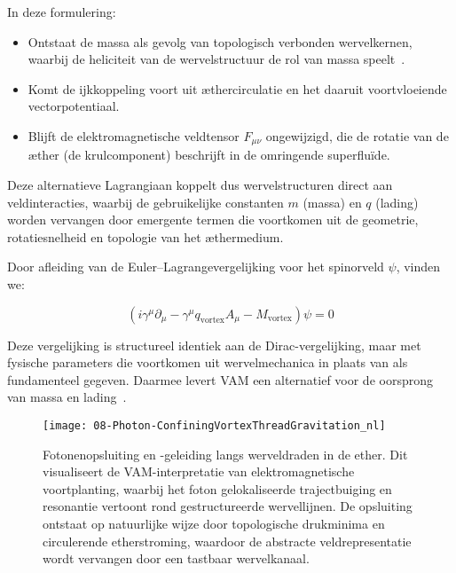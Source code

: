 In deze formulering:

\begin{itemize}
    \item Ontstaat de massa als gevolg van topologisch verbonden wervelkernen, waarbij de heliciteit van de wervelstructuur de rol van massa speelt~\cite{Volovik2003}.
    \item Komt de ijkkoppeling voort uit æthercirculatie en het daaruit voortvloeiende vectorpotentiaal.
    \item Blijft de elektromagnetische veldtensor \( F_{\mu\nu} \) ongewijzigd, die de rotatie van de æther (de krulcomponent) beschrijft in de omringende superfluïde.
\end{itemize}

Deze alternatieve Lagrangiaan koppelt dus wervelstructuren direct aan veldinteracties, waarbij de gebruikelijke constanten \( m \) (massa) en \( q \) (lading) worden vervangen door emergente termen die voortkomen uit de geometrie, rotatiesnelheid en topologie van het æthermedium.

Door afleiding van de Euler–Lagrangevergelijking voor het spinorveld \( \psi \), vinden we:

\begin{equation}
    \boxed{ \left( i \gamma^\mu \partial_\mu - \gamma^\mu q_\text{vortex} A_\mu - M_\text{vortex} \right)\psi = 0 }
\end{equation}

Deze vergelijking is structureel identiek aan de Dirac-vergelijking, maar met fysische parameters die voortkomen uit wervelmechanica in plaats van als fundamenteel gegeven. Daarmee levert VAM een alternatief voor de oorsprong van massa en lading~\cite{Barcelo2011,Volovik2003}.

\begin{figure}[H]
    \centering
    \texttt{[image: 08-Photon-ConfiningVortexThreadGravitation\_nl]}
    \caption{Fotonenopsluiting en -geleiding langs werveldraden in de ether. Dit visualiseert de VAM-interpretatie van elektromagnetische voortplanting, waarbij het foton gelokaliseerde trajectbuiging en resonantie vertoont rond gestructureerde wervellijnen. De opsluiting ontstaat op natuurlijke wijze door topologische drukminima en circulerende etherstroming, waardoor de abstracte veldrepresentatie wordt vervangen door een tastbaar wervelkanaal.}
    \label{fig:photon_confine}
\end{figure}